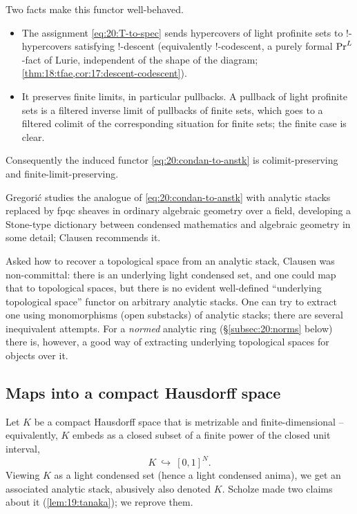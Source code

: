 Two facts make this functor well-behaved.
\begin{itemize}
\item The assignment \eqref{eq:20:T-to-spec} sends hypercovers of light
profinite sets to $!$-hypercovers satisfying $!$-descent (equivalently
$!$-codescent, a purely formal $\mathrm{Pr}^{L}$-fact of Lurie, independent of the shape
of the diagram; \cref{thm:18:tfae,cor:17:descent-codescent}).
\item It preserves finite limits, in particular pullbacks. A pullback of light
profinite sets is a filtered inverse limit of pullbacks of finite sets, which
goes to a filtered colimit of the corresponding situation for finite sets;
the finite case is clear.
\end{itemize}
Consequently the induced functor \eqref{eq:20:condan-to-anstk} is
colimit-preserving and finite-limit-preserving.

\begin{remark}
\label{rmk:20:gregoric}
Gregori\'c \cite{gregoric2024stonedualitycondensedmathematics} studies the
analogue of \eqref{eq:20:condan-to-anstk} with analytic stacks replaced by fpqc
sheaves in ordinary algebraic geometry over a field, developing a Stone-type
dictionary between condensed mathematics and algebraic geometry in some detail;
Clausen recommends it.
\end{remark}

\begin{remark}
\label{rmk:20:no-underlying-space}
Asked how to recover a topological space from an analytic stack, Clausen was
non-committal: there is an underlying light condensed set, and one could map
that to topological spaces, but there is no evident well-defined ``underlying
topological space'' functor on arbitrary analytic stacks. One can try to extract
one using monomorphisms (open substacks) of analytic stacks; there are several
inequivalent attempts. For a \emph{normed} analytic ring (\S\ref{subsec:20:norms}
below) there is, however, a good way of extracting underlying topological spaces
for objects over it.
\end{remark}

\subsection{Maps into a compact Hausdorff space}
\label{subsec:20:compact-hausdorff}

Let $K$ be a compact Hausdorff space that is metrizable and finite-dimensional
-- equivalently, $K$ embeds as a closed subset of a finite power of the closed
unit interval,
\begin{equation*}
K\ \hookrightarrow\ [0,1]^N .
\end{equation*}
Viewing $K$ as a light condensed set (hence a light condensed anima), we get an
associated analytic stack, abusively also denoted $K$. Scholze made two claims
about it (\cref{lem:19:tanaka}); we reprove them.

